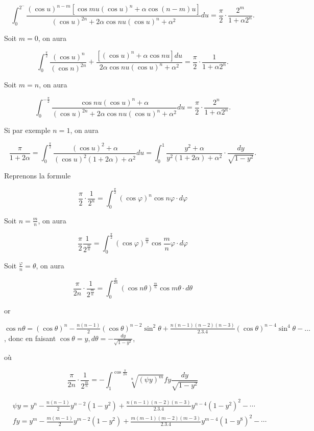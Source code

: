\documentclass{article}
\begin{document}
\[
\int_{0}^{2^{-}} \frac{(\cos u)^{n-m}\left[\cos m u(\cos u)^{n}+\alpha \cos (n-m) u\right]}{(\cos u)^{2 n}+2 \alpha \cos n u(\cos u)^{n}+\alpha^{2}} d u=\frac{\pi}{2} \cdot \frac{2^{m}}{1+\alpha 2^{n}} .
\]

Soit \(m=0\), on aura

\[
\int_{0}^{\frac{\pi}{2}} \frac{(\cos u)^{n}}{(\cos n)^{2 n}}+\frac{\left[(\cos u)^{n}+\alpha \cos n u\right] d u}{2 \alpha \cos n u(\cos u)^{n}+\alpha^{2}}=\frac{\pi}{2} \cdot \frac{1}{1+\alpha 2^{n}} .
\]

Soit \(m=n\), on aura

\[
\int_{0}^{-\frac{\pi}{2}} \frac{\cos n u(\cos u)^{n}+\alpha}{(\cos u)^{2 n}+2 \alpha \cos n u(\cos u)^{n}+\alpha^{2}} d u=\frac{\pi}{2} \cdot \frac{2^{n}}{1+\alpha 2^{n}} .
\]

Si par exemple \(n=1\), on aura

\[
\frac{\pi}{1+2 \alpha}=\int_{0}^{\frac{\pi}{2}} \frac{(\cos u)^{2}+\alpha}{(\cos u)^{2}(1+2 \alpha)+\alpha^{2}} d u=\int_{0}^{1} \frac{y^{2}+\alpha}{y^{2}(1+2 \alpha)+\alpha^{2}} \cdot \frac{d y}{\sqrt{1-y^{2}}} .
\]

Reprenons la formule

\[
\frac{\pi}{2} \cdot \frac{1}{2^{n}}=\int_{0}^{\frac{\pi}{2}}(\cos \varphi)^{n} \cos n \varphi \cdot d \varphi
\]

Soit \(n=\frac{m}{n}\), on aura

\[
\frac{\pi}{2} \frac{1}{2^{\frac{m}{n}}}=\int_{0}^{\frac{\pi}{2}}(\cos \varphi)^{\frac{m}{n}} \cos \frac{m}{n} \varphi \cdot d \varphi
\]

Soit \(\frac{\varphi}{n}=\theta\), on aura

\[
\frac{\pi}{2 n} \cdot \frac{1}{2^{\frac{m}{n}}}=\int_{0}^{\frac{\pi}{2 n}}(\cos n \theta)^{\frac{m}{n}} \cos m \theta \cdot d \theta
\]

or

\(\cos n \theta=(\cos \theta)^{n}-\frac{n(n-1)}{2}(\cos \theta)^{n-2} \sin ^{2} \theta+\frac{n(n-1)(n-2)(n-3)}{2.3 .4}(\cos \theta)^{n-4} \sin ^{4} \theta-\ldots\),
donc en faisant \(\cos \theta=y, d \theta=-\frac{d y}{\sqrt{1-y^{2}}}\),

où

\[
\frac{\pi}{2 n} \cdot \frac{1}{2^{\frac{m}{n}}}=-\int_{1}^{\cos \frac{\pi}{2 n}} \sqrt[n]{(\psi y)^{m}} f y \frac{d y}{\sqrt{1-y^{2}}}
\]

\[
\begin{aligned}
& \psi y=y^{n}-\frac{n(n-1)}{2} y^{n-2}\left(1-y^{2}\right)+\frac{n(n-1)(n-2)(n-3)}{2.3 .4} y^{n-4}\left(1-y^{2}\right)^{2}-\cdots \\
& f y=y^{m}-\frac{m(m-1)}{2} y^{m-2}\left(1-y^{2}\right)+\frac{m(m-1)(m-2)(m-3)}{2.3 .4} y^{m-4}\left(1-y^{8}\right)^{2}-\cdots
\end{aligned}
\]
\end{document}
